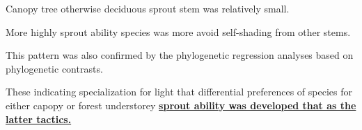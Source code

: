 \documentclass[a0, 25, plainboxedsections]{sciposter} %
\begin{document}
\begin{multicols}{2}
\begin{mdframed}[style=conclusion.frame,frametitle={\textbf{\Large{\faFlagAlt \vspace{0.02em} SYNTHESIS: {Sprout ability is evolved to against tree height, and promoted species coexistence.}}}}]
{    \faCaretRight Canopy tree otherwise deciduous sprout stem was relatively small.
    
    \faCaretRight More highly sprout ability species was more avoid self-shading from other stems.
    
    \faCaretRight This pattern was also confirmed by the phylogenetic regression analyses based on phylogenetic contrasts.
  }
  
  \vspace{0.4em}
  \faHandLeft These indicating specialization for light that differential preferences of species for either capopy or forest understorey \textbf{\underline{sprout ability was developed that as the latter tactics.}}
  
 
 
\end{mdframed}

\end{multicols}
\begin{mdframed}[style=section.frame]
  \LARGE\textbf{\color{white}{\faBeaker MATERIALS AND METHODS}}
\end{mdframed}\vspace{-1.2em}
\end{document}

